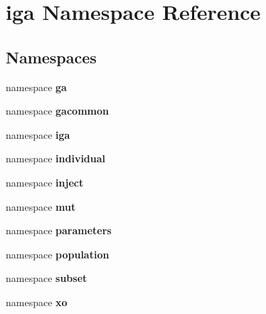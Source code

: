 \section{iga Namespace Reference}
\label{namespaceiga}


\subsection*{Namespaces}
\begin{CompactItemize}
\item 
namespace {\bf ga}
\item 
namespace {\bf gacommon}
\item 
namespace {\bf iga}
\item 
namespace {\bf individual}
\item 
namespace {\bf inject}
\item 
namespace {\bf mut}
\item 
namespace {\bf parameters}
\item 
namespace {\bf population}
\item 
namespace {\bf subset}
\item 
namespace {\bf xo}
\end{CompactItemize}
